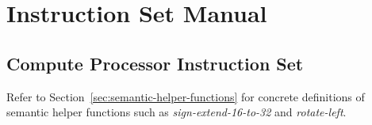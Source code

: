 %
%
%
%



\chapter{Instruction Set Manual}


\standardstretch
\section{Compute Processor Instruction Set}
\label{sec:compute-processor-instruction-set}

Refer to Section~\ref{sec:semantic-helper-functions} for concrete definitions of semantic helper functions
such as {\em{sign-extend-16-to-32}} and {\em{rotate-left}}.

